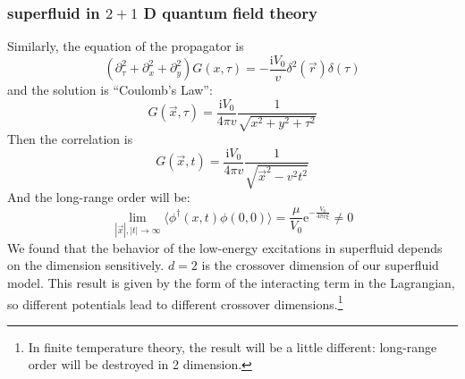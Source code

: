 \documentclass{article}
\newcommand{\im}{\mathrm{i}}
\newcommand{\ep}{\mathrm{e}}
\begin{document}
\subsubsection{superfluid in $2+1$ D quantum field theory}
Similarly, the equation of the propagator is
\begin{equation}
(\partial_\tau^2 +\partial_x^2 +\partial_y^2)G(x,\tau) = -\frac{\im V_0}{v}\delta^2(\vec{r})\delta(\tau)
\end{equation}
and the solution is ``Coulomb's Law'':
$$
G(\vec{x},\tau) = \frac{\im V_0}{4\pi v}\frac{1}{\sqrt{x^2+y^2+ \tau^2}}
$$
Then the correlation is
\begin{equation}
G(\vec{x},t) = \frac{\im V_0}{4\pi v}\frac{1}{\sqrt{\vec{x}^2-v^2t^2}}
\end{equation}
And the long-range order will be:
\begin{equation}
\lim_{|\vec{x}|,|t|\rightarrow \infty}\langle \phi^\dagger(x,t)\phi(0,0)\rangle = \frac{\mu}{V_0}\ep^{-\frac{V_0}{4\pi v \xi}} \neq 0
\end{equation}
We found that the behavior of the low-energy excitations in superfluid depends on the dimension sensitively. $d=2$ is the crossover dimension of our superfluid model. This result is given by the form of the interacting term in the Lagrangian, so different potentials lead to different crossover dimensions.\footnote{In finite temperature theory, the result will be a little different: long-range order will be destroyed in 2 dimension.}
\end{document}
